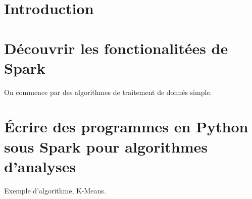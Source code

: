 \documentclass[12pt]{article}
\begin{document}
\tableofcontents
{}
\pagebreak


\section*{Introduction}
\section{D\'ecouvrir les fonctionalit\'ees de Spark}
On commence par des algorithmes de traitement de donn\'es simple.
\section{\'Ecrire des programmes en Python sous Spark pour algorithmes d'analyses}
Exemple d'algorithme, K-Means.
\end{document}
